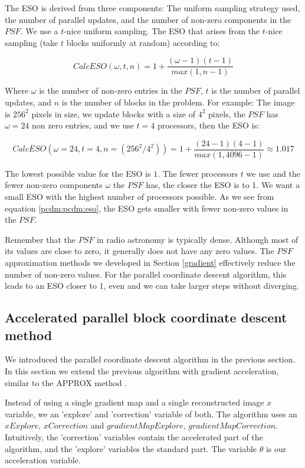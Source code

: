 The ESO is derived from three components: The uniform sampling strategy used, the number of parallel updates, and the number of non-zero components in the $PSF$. We use a $t$-nice uniform sampling. The ESO that arises from the $t$-nice sampling (take $t$ blocks uniformly at random) according to\cite{richtarik2016parallel}:

\begin{equation}\label{pcdm:pcdm:eso}
CalcESO(\omega, t, n) = 1+ \frac{(\omega - 1)(t - 1)}{max(1, n -1)}
\end{equation}

Where $\omega$ is the number of non-zero entries in the $PSF$, $t$ is the number of parallel updates, and $n$ is the number of blocks in the problem. For example: The image is $256^2$ pixels in size, we update blocks with a size of $4^2$ pixels, the $PSF$ has $\omega = 24$ non zero entries, and we use $t = 4$ processors, then the ESO is:

\begin{equation}
CalcESO(\omega = 24, t = 4, n = (256^2 / 4^2)) = 1+ \frac{(24 - 1)(4 - 1)}{max(1, 4096 -1)} \approx 1.017
\end{equation}

The lowest possible value for the ESO is $1$. The fewer processors $t$ we use and the fewer non-zero components $\omega$ the $PSF$ has, the closer the ESO is to 1. We want a small ESO with the highest number of processors possible. As we see from equation \eqref{pcdm:pcdm:eso}, the ESO gets smaller with fewer non-zero values in the $PSF$.

Remember that the $PSF$ in radio astronomy is typically dense. Although most of its values are close to zero, it generally does not have any zero values. The $PSF$ approximation methods we developed in Section \ref{gradient} effectively reduce the number of non-zero values. For the parallel coordinate descent algorithm, this leads to an ESO closer to 1, even  and we can take larger steps without diverging.


\subsection{Accelerated parallel block coordinate descent method}
We introduced the parallel coordinate descent algorithm in the previous section. In this section we extend the previous algorithm with gradient acceleration, similar to the APPROX method \cite{fercoq2015accelerated}.

Instead of using a single gradient map and a single reconstructed image $x$ variable, we an 'explore' and 'correction' variable of both. The algorithm uses an $xExplore$,  $xCorrection$ and $gradientMapExplore$, $gradientMapCorrection$. Intuitively, the 'correction' variables contain the accelerated part of the algorithm, and the 'explore' variables the standard part. The variable $\theta$ is our acceleration variable.

